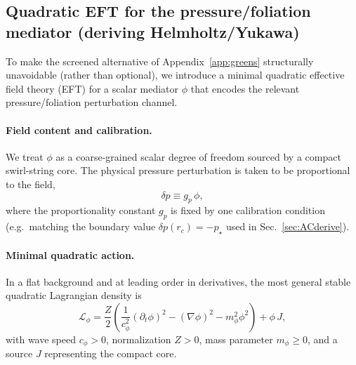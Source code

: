 \documentclass[pdflatex,sn-mathphys-num]{revtex4-2}
\providecommand{\rc}{r_c}
\begin{document}
    \subsection{Quadratic EFT for the pressure/foliation mediator (deriving Helmholtz/Yukawa)}
    \label{sec:eft_mediator}

    To make the screened alternative of Appendix~\ref{app:greens} structurally unavoidable (rather than optional),
    we introduce a minimal quadratic effective field theory (EFT) for a scalar mediator \(\phi\) that encodes the
    relevant pressure/foliation perturbation channel.

    \paragraph{Field content and calibration.}
        We treat \(\phi\) as a coarse-grained scalar degree of freedom sourced by a compact swirl-string core.
        The physical pressure perturbation is taken to be proportional to the field,
        \begin{equation}
            \delta p \equiv g_p\,\phi,
            \label{eq:dp_phi}
        \end{equation}
        where the proportionality constant \(g_p\) is fixed by one calibration condition (e.g.\ matching the boundary
        value \(\delta p(\rc)=-p_\star\) used in Sec.~\ref{sec:ACderive}).

    \paragraph{Minimal quadratic action.}
        In a flat background and at leading order in derivatives, the most general stable quadratic Lagrangian density is
        \begin{equation}
            \mathcal{L}_\phi
            =
            \frac{Z}{2}\left(
            \frac{1}{c_\phi^{2}}(\partial_t \phi)^2
            -
            (\nabla \phi)^2
            -
            m_\phi^{2}\phi^2
            \right)
            +\phi\,J,
            \label{eq:Lphi}
        \end{equation}
        with wave speed \(c_\phi>0\), normalization \(Z>0\), mass parameter \(m_\phi\ge 0\), and a source \(J\)
        representing the compact core.
\end{document}
